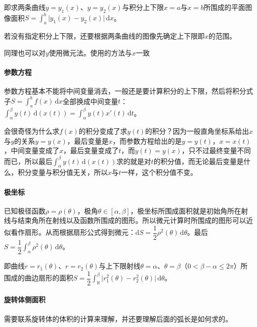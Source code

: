 \documentclass[UTF8, 12pt]{ctexart}
\begin{document}
        即求两条曲线$y=y_1(x)$、$y=y_2(x)$与积分上下限$x=a$与$x=b$所围成的平面图像面积$S=\int_a^b\vert y_1(x)-y_2(x)\vert\,\textrm{d}x$。

        若没有指定积分上下限，还要根据两条曲线的图像先确定上下限即$x$的范围。

        同理也可以对$y$使用微元法。使用的方法与$x$一致

        \paragraph{参数方程} \leavevmode \medskip

        参数方程基本不能将中间变量消去，一般还是要计算积分的上下限，然后将积分式子$S=\int_a^bf(x)\,\textrm{d}x$全部换成中间变量$t$：$\int_\alpha^\beta y(t)\,\textrm{d}(x(t))=\int_\alpha^\beta y(t)x'(t)\,\textrm{d}t$。

        会很奇怪为什么求$f(x)$的积分变成了求$y(t)$的积分？因为一般直角坐标系给出$x$与$y$的关系$y=y(x)$，最后变量是$x$，而参数方程给出的是$y=y(t)$，$x=x(t)$，中间变量变成了$x$，最后变量变成了$t$，而$y(t)=y(x)$，只不过最终变量不同而已，所以最后$\int_\alpha^\beta y(t)\,\textrm{d}(x(t))$求的就是对$t$的积分值，而无论最后变量是什么，积分变量与积分值无关，所以$x$与$t$一样，这个积分值不变。

        \paragraph{极坐标} \leavevmode \medskip

        已知极径函数$\rho=\rho(\theta)$，极角$\theta\in[\alpha,\beta]$，极坐标所围成面积就是初始角所在射线与结束角所在射线以及函数所围成的图形。所以微元计算时所围成的图形可以近似看作扇形。从而根据扇形公式得到微元：$\textrm{d}S=\dfrac{1}{2}\rho^2(\theta)\,\textrm{d}\theta$。最后$S=\dfrac{1}{2}\int_\alpha^\beta\rho^2(\theta)\,\textrm{d}\theta$。

        即曲线$r=r_1(\theta)$、$r=r_2(\theta)$与上下限射线$\theta=\alpha$、$\theta=\beta$（$0<\beta-\alpha\leqslant2\pi$）所围成的曲边扇形的面积$S=\dfrac{1}{2}\int_\aleph^\beta\vert r_1^2(\theta)-r_2^2(\theta)\vert\,\textrm{d}\theta$。

        \paragraph{旋转体侧面积} \leavevmode \medskip

        需要联系旋转体的体积的计算来理解，并还要理解后面的弧长是如何求的。
\end{document}
